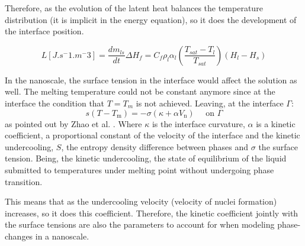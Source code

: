 \noindent Therefore, as the evolution of the latent heat balances the temperature distribution (it is implicit in the energy equation), so it does the development of the interface position.

\begin{equation}
\label{3.50}
L [J.s^-1.m^-3]= \frac{d m_{l s}}{d t}\Delta H_{f}=C_{f} \rho_{l} \alpha_{l}\left(\frac{T_{s a t}-T_{l}}{T_{s a t}}\right)(H_{l}-H_{s})
\end{equation}

\noindent In the nanoscale, the surface tension in the interface would affect the solution as well. The melting temperature could not be constant anymore since at the interface the condition that $T = T_{m}$ is not achieved. Leaving, at the interface $\Gamma$:
\begin{equation}
s\left(T-T_{\mathrm{m}}\right)=-\sigma\left(\kappa+\alpha V_{\mathrm{n}}\right) \quad \text { on } \Gamma
\label{3.51}
\end{equation}
as pointed out by Zhao et al. \cite{zhao_zhao_xu_2018}. Where $\kappa$ is the interface curvature,  $\alpha$	is a kinetic coefficient, a proportional constant of the velocity of the interface and the kinetic undercooling, $S$, the entropy density difference between phases and $\sigma$ the surface tension. Being, the kinetic undercooling, the state of equilibrium of the liquid submitted to temperatures under melting point without undergoing phase transition. 

\noindent This means that as the undercooling velocity (velocity of nuclei formation) increases, so it does this coefficient. Therefore, the kinetic coefficient jointly with the surface tensions are also the parameters to account for when modeling phase-changes in a nanoscale.